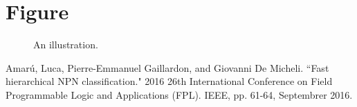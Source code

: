 \documentclass{MasterThesis}
\begin{document}
\newpage
\section{Figure}

\begin{figure}[h]
\begin{center}
\caption{An illustration.}
\end{center}
\end{figure}

\newpage
\begin{thebibliography}{00}
 Amarú, Luca, Pierre-Emmanuel Gaillardon, and Giovanni De Micheli. 
``Fast hierarchical NPN classification."
2016 26th International Conference on Field Programmable Logic and Applications (FPL). IEEE, pp. 61-64, Septembrer 2016.
\end{thebibliography}
\end{document}
